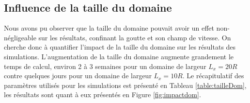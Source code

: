 \subsection{Influence de la taille du domaine} \label{sec:tailledom}
Nous avons pu observer que la taille du domaine pouvait avoir un effet non-négligeable sur les résultats, confinant la goutte et son champ de vitesse. On cherche donc à quantifier l'impact de la taille du domaine sur les résultats des simulations. L'augmentation de la taille du domaine augmente grandement le temps de calcul, environ 2 à 3 semaines pour un domaine de largeur $L_x = 20R$ contre quelques jours pour un domaine de largeur $L_x = 10R$. Le récapitulatif des paramètres utilisés pour les simulations est présenté en Tableau \ref{table:tailleDom}, les résultats sont quant à eux présentés en Figure \ref{fig:impactdom}.


